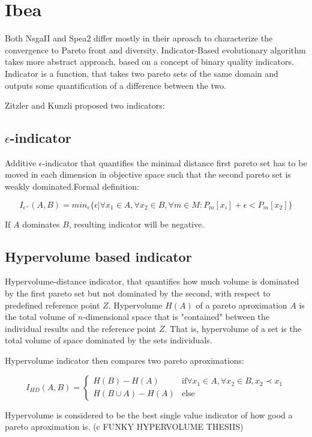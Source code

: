 \documentclass[12pt,oneside]{fithesis2}
\begin{document}
\section{Ibea}
Both NsgaII and Spea2 differ mostly in their aproach to characterize the convergence to Pareto front and diversity. 
Indicator-Based evolutionary algorithm takes more abstract approach, based on a concept of binary quality indicators.
Indicator is a function, that takes two pareto sets of the same domain and outputs some quantification of a difference between the two.

Zitzler and Kunzli proposed two indicators:


\subsection{$\epsilon$-indicator}   
Additive $\epsilon$-indicator that quantifies the minimal distance first pareto set has to be moved in each dimension in objective space such that the second pareto set is weakly dominated.Formal definition:

$$I_{\epsilon^+}(A,B) = min_\epsilon\{\epsilon |\forall x_1 \in A, \forall x_2 \in B, \forall m \in M: P_m[x_i] + \epsilon < P_m[x_2] \} $$

If $A$ dominates $B$, resulting indicator will be negative.

\subsection{Hypervolume based indicator}   
Hypervolume-distance indicator, that quantifies how much volume is dominated by the first pareto set but not dominated by the second, with respect to predefined reference point $Z$. 
Hypervolume $H(A)$ of a pareto aproximation $A$ is the total volume of $n$-dimensional space that is "contained" between the individual results and the reference point $Z$. That is, hypervolume of a set is the total volume of space dominated by the sets individuals.

Hypervolume indicator then compares two pareto aproximations:

$$I_{HD}(A,B) = 
\begin{cases} 
    H(B) - H(A) & \text{if} \forall x_1 \in A, \forall x_2 \in B, x_2 \prec x_1 \\
    H(B \cup A) - H(A) & \text{else}
\end{cases}$$

Hypervolume is considered to be the best single value indicator of how good a pareto aproximation is. (c FUNKY HYPERVOLUME THESIIS) 
\end{document}
